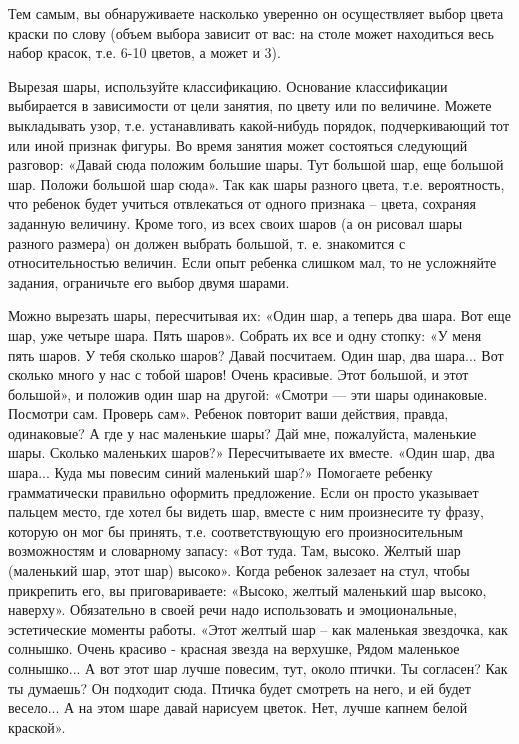 \documentclass[a5paper]{book}
\begin{document}
Тем самым, вы обнаруживаете насколько уверенно он осуществляет выбор
цвета краски по слову (объем выбора зависит от вас: на столе может
находиться весь набор красок, т.е. 6-10 цветов, а может и 3).

Вырезая шары, используйте классификацию. Основание классификации
выбирается в зависимости от цели занятия, по цвету или по величине.
Можете выкладывать узор, т.е. устанавливать какой-нибудь порядок,
подчеркивающий тот или иной признак фигуры. Во время занятия может
состояться следующий разговор: «Давай сюда положим большие шары. Тут
большой шар, еще большой шар. Положи большой шар сюда». Так как шары
разного цвета, т.е. вероятность, что ребенок будет учиться отвлекаться
от одного признака -- цвета, сохраняя заданную величину. Кроме того, из
всех своих шаров (а он рисовал шары разного размера) он должен выбрать
большой, т. е. знакомится с относительностью величин. Если опыт ребенка
слишком мал, то не усложняйте задания, ограничьте его выбор двумя
шарами.

Можно вырезать шары, пересчитывая их: «Один шар, а теперь два шара. Вот
еще шар, уже четыре шара. Пять шаров». Собрать их все и одну стопку: «У
меня пять шаров. У тебя сколько шаров? Давай посчитаем. Один шар, два
шара... Вот сколько много у нас с тобой шаров! Очень красивые. Этот
большой, и этот большой», и положив один шар на другой: «Смотри --- эти
шары одинаковые. Посмотри сам. Проверь сам». Ребенок повторит ваши
действия, правда, одинаковые? А где у нас маленькие шары? Дай мне,
пожалуйста, маленькие шары. Сколько маленьких шаров?» Пересчитываете их
вместе. «Один шар, два шара... Куда мы повесим синий маленький шар?»
Помогаете ребенку грамматически правильно оформить предложение. Если он
просто указывает пальцем место, где хотел бы видеть шар, вместе с ним
произнесите ту фразу, которую он мог бы принять, т.е. соответствующую
его произносительным возможностям и словарному запасу: «Вот туда. Там,
высоко. Желтый шар (маленький шар, этот шар) высоко». Когда ребенок
залезает на стул, чтобы прикрепить его, вы приговариваете: «Высоко,
желтый маленький шар высоко, наверху». Обязательно в своей речи надо
использовать и эмоциональные, эстетические моменты работы. «Этот желтый
шар -- как маленькая звездочка, как солнышко. Очень красиво - красная
звезда на верхушке, Рядом маленькое солнышко... А вот этот шар лучше
повесим, тут, около птички. Ты согласен? Как ты думаешь? Он подходит
сюда. Птичка будет смотреть на него, и ей будет весело... А на этом шаре
давай нарисуем цветок. Нет, лучше капнем белой краской».
\end{document}
